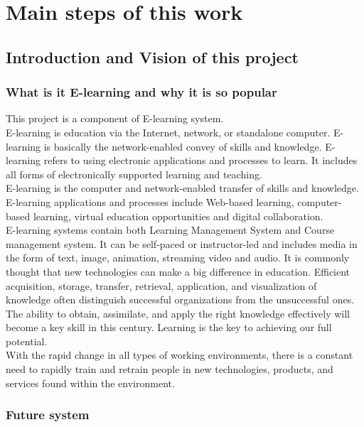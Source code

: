 \documentclass{scrartcl}
\begin{document}
 



\section{Main steps of this work}


\subsection{Introduction and Vision of this project}
  \subsubsection{What is it E-learning and why it is so popular}
  	
This project is a component of E-learning system. \\
E-learning is education via the Internet, network, or standalone computer. E-learning is basically the network-enabled convey of skills and knowledge. E-learning refers to using electronic applications and processes to learn. It includes all forms of electronically supported learning and teaching.\\
 E-learning is the computer and network-enabled transfer of skills and knowledge. E-learning applications and processes include Web-based learning, computer-based learning, virtual education opportunities and digital collaboration.\\
E-learning systems contain both Learning Management System and Course management system. It can be self-paced or instructor-led and includes media in the form of text, image, animation, streaming video and audio. It is commonly thought that new technologies can make a big difference in education.
Efficient acquisition, storage, transfer, retrieval, application, and visualization of knowledge often distinguish successful organizations from the unsuccessful ones. The ability to obtain, assimilate, and apply the right knowledge effectively will become a key skill in this century. Learning is the key to achieving our full potential.\\
With the rapid change in all types of working environments, there is a constant need to rapidly train and retrain people in new technologies, products, and services found within the environment.\\
\subsubsection{Future system}
\end{document}
